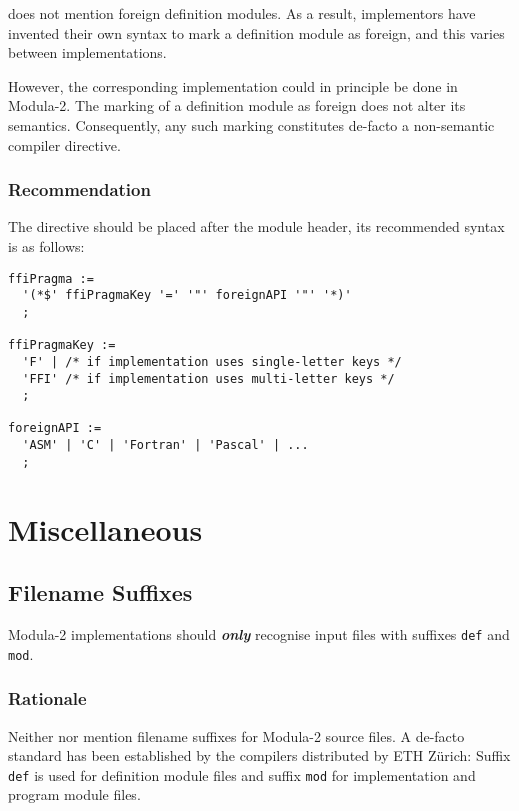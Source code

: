 \documentclass[10pt,a4paper]{article}
\renewcommand{\emph}[1]{\textbf{\textit{#1}}}
\begin{document}
\cite{Wirth88} does not mention \glspl{foreign definition module}. As a result,
implementors have invented their own syntax to mark a definition module as
foreign, and this varies between implementations.

However, the corresponding implementation could in principle be done in
Modula-2. The marking of a definition module as foreign does not alter its
semantics. Consequently, any such marking constitutes de-facto a
\gls{non-semantic compiler directive}.

\subsubsection{Recommendation}

The directive should be placed after the module header, its recommended syntax
is as follows:

\begin{verbatim}
ffiPragma :=
  '(*$' ffiPragmaKey '=' '"' foreignAPI '"' '*)'
  ;
  
ffiPragmaKey :=
  'F' | /* if implementation uses single-letter keys */
  'FFI' /* if implementation uses multi-letter keys */
  ; 

foreignAPI :=
  'ASM' | 'C' | 'Fortran' | 'Pascal' | ...
  ;
\end{verbatim}


\section{Miscellaneous}

\subsection{Filename Suffixes}

Modula-2 implementations should \emph{only} recognise input files with
suffixes \verb|def| and \verb|mod|.

\subsubsection{Rationale}

Neither \cite{Wirth78} nor \cite{Wirth88} mention filename suffixes for
Modula-2 source files. A de-facto standard has been established by the
compilers distributed by ETH Z\"{u}rich: Suffix \verb|def| is used for
definition module files and suffix \verb|mod| for implementation and program
module files.
\end{document}
